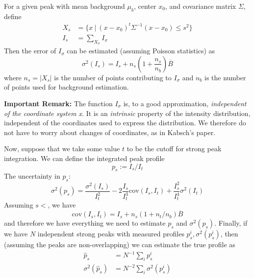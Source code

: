 \documentclass[twocolumn,preprintnumbers,amsmath,amssymb]{revtex4}
\newcommand{\cov}{\mathrm{cov}}
\begin{document}
For a given peak with mean background $\mu_b$, center $x_0$, and covariance matrix $\Sigma$, define
\begin{align}
  X_s &= \{ x \ | \ (x-x_0)^t\Sigma^{-1}(x-x_0) \leq s^2\} \\
  I_s &= \sum_{X_\sigma} I_x
\end{align}
Then the error of $I_\sigma$ can be estimated (assuming Poisson statistics) as
\begin{equation}
  \sigma^2(I_s) = I_s + n_s(1+\frac{n_s}{n_b}) \overline{B}
\end{equation}
where $n_s = |X_s|$ is the number of points contributing to $I_\sigma$ and $n_b$ is the number of points used for background estimation.

\textbf{Important Remark:} The function $I_\sigma$ is, to a good approximation, \emph{independent of the coordinate system x}.
It is an \emph{intrinsic} property of the intensity distribution, independent of the coordinates used to express the distribution.
We therefore do not have to worry about changes of coordinates, as in Kabsch's paper.


Now, suppose that we take some value $t$ to be the cutoff for strong peak integration. We can define the integrated peak profile
\begin{equation}
  p_s := I_s / I_t
\end{equation}
The uncertainty in $p_s$:
\begin{equation}
  \sigma^2(p_s) = \frac{\sigma^2(I_s)}{I_t^2} - 2 \frac{I_s}{I_t^3} \cov(I_s, I_t) + \frac{I_s^2}{I_t^4} \sigma^2(I_t)
\end{equation}
Assuming $s < $, we have
\begin{equation}
  \cov(I_s, I_t) = I_s + n_s(1+n_t/n_b)\overline{B}
\end{equation}
and therefore we have everything we need to estimate $p_s$ and $\sigma^2(p_s)$. Finally, if we have $N$ independent strong
peaks with measured profiles $p^i_s, \sigma^2(p^i_s)$, then (assuming the peaks are non-overlapping) we can estimate the
true profile as
\begin{align}
  \hat{p}_s &= N^{-1} \sum_i p^i_s \\
 \sigma^2(\hat{p}_s) &= N^{-2} \sum_i \sigma^2(p^i_s)
\end{align}
\end{document}
